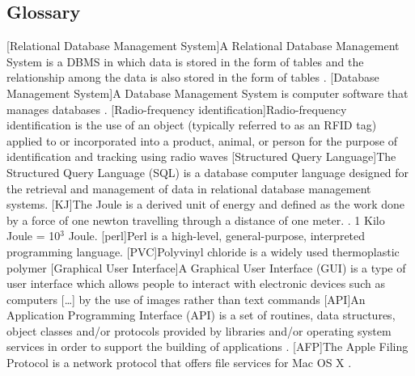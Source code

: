 \documentclass[a4paper,10pt,twoside,titlepage,headings=small,bibliography=totocnumbered,headsepline]{scrartcl}
\begin{document}
\begin{appendix}


\newpage

\section{Glossary}
\begin{acronym}
[Relational Database Management System]{A Relational Database Management System is a \acs{DBMS} in which data is stored in the form of tables and the relationship among the data is also stored in the form of tables \citep{wiki:rdbms}.}
[Database Management System]{A Database Management System is computer software that manages databases \citep{wiki:dbms}.}
[Radio-frequency identification]{Radio-frequency identification is the use of an object (typically referred to as an RFID tag) applied to or incorporated into a product, animal, or person for the purpose of identification and tracking using radio waves \citep{wiki:rfid}}
[Structured Query Language]{The Structured Query Language (SQL) is a database computer language designed for the retrieval and management of data in relational database management systems.\citep{wiki:sql}}
[KJ]{The Joule is a derived unit of energy and defined as the work done by a force of one newton travelling through a distance of one meter. \citep{wiki:joule}. 1 Kilo Joule = 10$^3$ Joule.}
[perl]{Perl is a high-level, general-purpose, interpreted programming language. \citep{wiki:perl}}
[PVC]{Polyvinyl chloride is a widely used thermoplastic polymer \citep{wiki:pvc}}
[Graphical User Interface]{A Graphical User Interface (GUI) is a type of user interface which allows people to interact with electronic devices such as computers [\ldots] by the use of images rather than text commands \citep{wiki:gui}}
[API]{An Application Programming Interface (API) is a set of routines, data structures, object classes and/or protocols provided by libraries and/or operating system services in order to support the building of applications \citep{wiki:api}.}
[AFP]{The Apple Filing Protocol is a network protocol that offers file services for Mac OS X \citep{wiki:afp}.}

\end{acronym}
\end{appendix}
\end{document}
